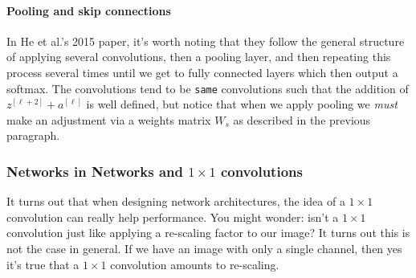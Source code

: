 \documentclass[12pt]{article}
\begin{document}
\paragraph{Pooling and skip connections}
In He et al.'s 2015 paper, it's worth noting that they follow the general structure of applying several convolutions, then a pooling layer, and then repeating this process several times until we get to fully connected layers which then output a softmax. 
The convolutions tend to be \texttt{same}
convolutions such that the addition of $z^{[\ell+2]} + a^{[\ell]}$ is well defined, but notice that when we apply pooling we 
\emph{must} make an adjustment via a weights matrix $W_s$ as described in the previous paragraph.

\subsubsection{Networks in Networks and $1 \times 1$ convolutions} It turns out that when designing network architectures,
the idea of a $1 \times 1$ convolution can really help performance. You might wonder: isn't a $1 \times 1$ convolution just like
applying a re-scaling factor to our image? It turns out this is not the case in general. If we have an image with only a single
channel, then yes it's true that a $1\times 1$ convolution amounts to re-scaling.
\end{document}

